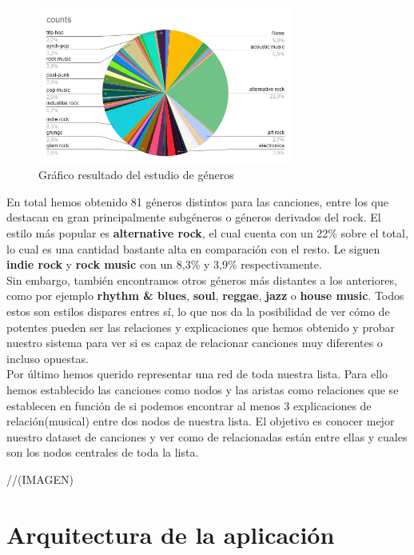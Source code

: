 \begin{figure}[h!]
	\centering
	\includegraphics[width = 0.75\textwidth]{Imagenes/Bitmap/estudioGeneros.png}
	\caption{Gráfico resultado del estudio de géneros}
	\label{fig:sampleImage}
\end{figure}

En total hemos obtenido 81 géneros distintos para las canciones, entre los que destacan en gran principalmente subgéneros o géneros derivados del rock. El estilo más popular es \textbf{alternative rock}, el cual cuenta con un 22\% sobre el total, lo cual es una cantidad bastante alta en comparación con el resto. Le siguen \textbf{indie rock} y \textbf{rock music} con un 8,3\% y 3,9\% respectivamente.\\

Sin embargo, también encontramos otros géneros más distantes a los anteriores, como por ejemplo \textbf{rhythm \& blues}, \textbf{soul}, \textbf{reggae}, \textbf{jazz} o \textbf{house music}. Todos estos son estilos dispares entres sí, lo que nos da la posibilidad de ver cómo de potentes pueden ser las relaciones y explicaciones que hemos obtenido y probar nuestro sistema para ver si es capaz de relacionar canciones muy diferentes o incluso opuestas.\\

Por último hemos querido representar una red de toda nuestra lista. Para ello hemos establecido las canciones como nodos y las aristas como relaciones que se establecen en función de si podemos encontrar al menos 3 explicaciones de relación(musical) entre dos nodos de nuestra lista. El objetivo es conocer mejor nuestro dataset de canciones y ver como de relacionadas están entre ellas y cuales son los nodos centrales de toda la lista.

//(IMAGEN)

\section{Arquitectura de la aplicación}

